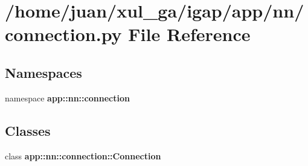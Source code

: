 \section{/home/juan/xul\_\-ga/igap/app/nn/connection.py File Reference}
\label{connection_8py}
\subsection*{Namespaces}
\begin{CompactItemize}
\item 
namespace {\bf app::nn::connection}
\end{CompactItemize}
\subsection*{Classes}
\begin{CompactItemize}
\item 
class {\bf app::nn::connection::Connection}
\end{CompactItemize}
